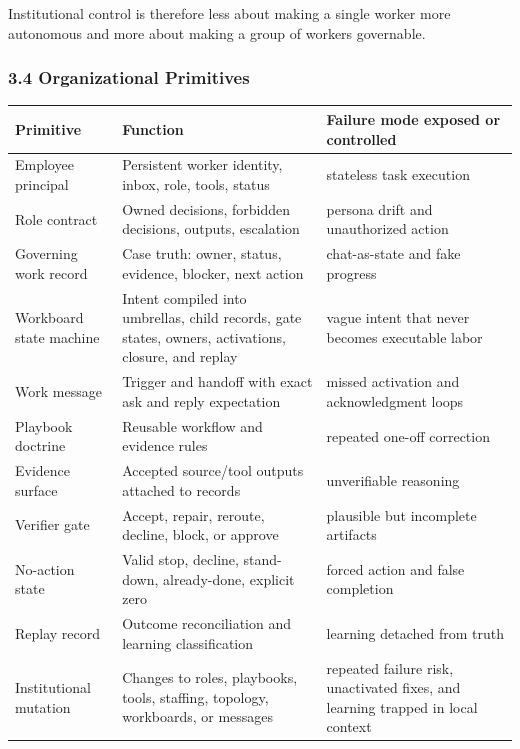 \documentclass[
]{article}
\newcounter{none} %
\begin{document}
Institutional control is therefore less about making a single worker more autonomous and more about making a group of workers governable.

\subsubsection{3.4 Organizational Primitives}\label{organizational-primitives}

{\def\LTcaptype{none} %
\begin{longtable}[]{@{}
  >{\raggedright\arraybackslash}p{}
  >{\raggedright\arraybackslash}p{}
  >{\raggedright\arraybackslash}p{}@{}}
\toprule\noalign{}
\begin{minipage}[b]{\linewidth}\raggedright
Primitive
\end{minipage} & \begin{minipage}[b]{\linewidth}\raggedright
Function
\end{minipage} & \begin{minipage}[b]{\linewidth}\raggedright
Failure mode exposed or controlled
\end{minipage} \\
\midrule\noalign{}
\endhead
\bottomrule\noalign{}
\endlastfoot
Employee principal & Persistent worker identity, inbox, role, tools, status & stateless task execution \\
Role contract & Owned decisions, forbidden decisions, outputs, escalation & persona drift and unauthorized action \\
Governing work record & Case truth: owner, status, evidence, blocker, next action & chat-as-state and fake progress \\
Workboard state machine & Intent compiled into umbrellas, child records, gate states, owners, activations, closure, and replay & vague intent that never becomes executable labor \\
Work message & Trigger and handoff with exact ask and reply expectation & missed activation and acknowledgment loops \\
Playbook doctrine & Reusable workflow and evidence rules & repeated one-off correction \\
Evidence surface & Accepted source/tool outputs attached to records & unverifiable reasoning \\
Verifier gate & Accept, repair, reroute, decline, block, or approve & plausible but incomplete artifacts \\
No-action state & Valid stop, decline, stand-down, already-done, explicit zero & forced action and false completion \\
Replay record & Outcome reconciliation and learning classification & learning detached from truth \\
Institutional mutation & Changes to roles, playbooks, tools, staffing, topology, workboards, or messages & repeated failure risk, unactivated fixes, and learning trapped in local context \\
\end{longtable}
}
\end{document}
